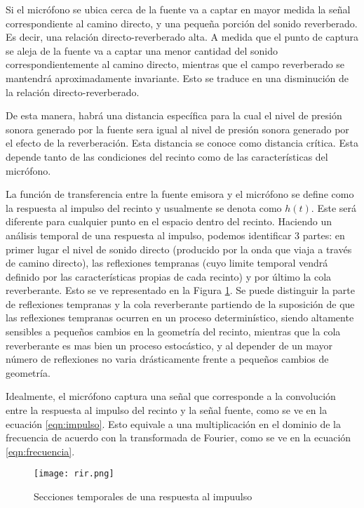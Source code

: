 Si el micrófono se ubica cerca de la fuente va a captar en mayor medida la señal correspondiente al camino directo, y una pequeña porción del sonido reverberado. Es decir, una relación directo-reverberado alta. A medida que el punto de captura se aleja de la fuente va a captar una menor cantidad del sonido correspondientemente al camino directo, mientras que el campo reverberado se mantendrá aproximadamente invariante. Esto se traduce en una disminución de la relación directo-reverberado. 

De esta manera, habrá una distancia específica para la cual el nivel de presión sonora generado por la fuente sera igual al nivel de presión sonora generado por el efecto de la reverberación. Esta distancia se conoce como distancia crítica. Esta depende tanto de las condiciones del recinto como de las características del micrófono. 

La función de transferencia entre la fuente emisora y el micrófono se define como la respuesta al impulso del recinto y usualmente se denota como $h(t)$. Este será diferente para cualquier punto en el espacio dentro del recinto. Haciendo un análisis temporal de una respuesta al impulso, podemos identificar 3 partes: en primer lugar el nivel de sonido directo (producido por la onda que viaja a través de camino directo), las reflexiones tempranas (cuyo limite temporal vendrá definido por las características propias de cada recinto) y por último la cola reverberante. Esto se ve representado en la Figura \ref{fig:rir}. Se puede distinguir la parte de reflexiones tempranas y la cola reverberante partiendo de la suposición de que las reflexiones tempranas ocurren en un proceso determinístico, siendo altamente sensibles a pequeños cambios en la geometría del recinto, mientras que la cola reverberante es mas bien un proceso estocástico, y al depender de un mayor número de reflexiones no varia drásticamente frente a pequeños cambios de geometría.  

Idealmente, el micrófono captura una señal que corresponde a la convolución entre la respuesta al impulso del recinto y la señal fuente, como se ve en la ecuación \ref{eqn:impulso}. Esto equivale a una multiplicación en el dominio de la frecuencia de acuerdo con la transformada de Fourier, como se ve en la ecuación \ref{eqn:frecuencia}.  

\begin{figure}[H]
  \centering{}
  \texttt{[image: rir.png]}
  \caption{Secciones temporales de una respuesta al impuulso}
  \label{fig:rir}
\end{figure}


